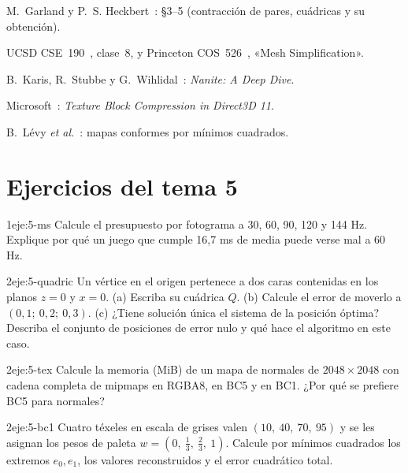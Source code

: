 \begin{lecturas}
\item M.~Garland y P.~S. Heckbert~\cite{garland}: §3--5 (contracción de pares, cuádricas y su obtención).
\item UCSD CSE~190~\cite{ucsd190}, clase~8, y Princeton COS~526~\cite{cos526}, «Mesh Simplification».
\item B.~Karis, R.~Stubbe y G.~Wihlidal~\cite{nanite}: \emph{Nanite: A Deep Dive}.
\item Microsoft~\cite{msbc}: \emph{Texture Block Compression in Direct3D 11}.
\item B.~Lévy \emph{et al.}~\cite{lscm}: mapas conformes por mínimos cuadrados.
\end{lecturas}

\section*{Ejercicios del tema 5}

\begin{ejercicio}{1}{eje:5-ms}
Calcule el presupuesto por fotograma a 30, 60, 90, 120 y 144 Hz. Explique por qué un juego que cumple 16,7 ms de media puede verse mal a 60 Hz.
\end{ejercicio}

\begin{ejercicio}{2}{eje:5-quadric}
Un vértice en el origen pertenece a dos caras contenidas en los planos $z=0$ y $x=0$. (a) Escriba su cuádrica $Q$. (b) Calcule el error de moverlo a $(0{,}1;\ 0{,}2;\ 0{,}3)$. (c) ¿Tiene solución única el sistema de la posición óptima? Describa el conjunto de posiciones de error nulo y qué hace el algoritmo en este caso.
\end{ejercicio}

\begin{ejercicio}{2}{eje:5-tex}
Calcule la memoria (MiB) de un mapa de normales de $2048\times 2048$ con cadena completa de mipmaps en RGBA8, en BC5 y en BC1. ¿Por qué se prefiere BC5 para normales?
\end{ejercicio}

\begin{ejercicio}{2}{eje:5-bc1}
Cuatro téxeles en escala de grises valen $(10,\ 40,\ 70,\ 95)$ y se les asignan los pesos de paleta $w=(0,\ \tfrac13,\ \tfrac23,\ 1)$. Calcule por mínimos cuadrados los extremos $e_0,e_1$, los valores reconstruidos y el error cuadrático total.
\end{ejercicio}

